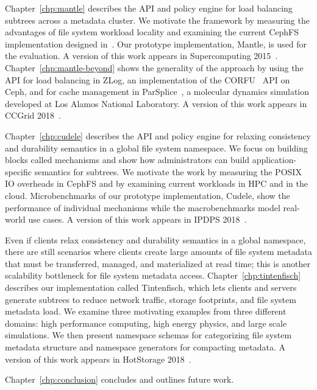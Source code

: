 Chapter~\ref{chp:mantle} describes the API and policy engine for load balancing
subtrees across a metadata cluster. We motivate the framework by measuring the
advantages of file system workload locality and examining the current CephFS
implementation designed in~\cite{weil:osdi2006-ceph, weil:sc2004-dyn-metadata}.
Our prototype implementation, Mantle, is used for the evaluation. A version of
this work appears in Supercomputing 2015~\cite{sevilla:sc15-mantle}.
Chapter~\ref{chp:mantle-beyond} shows the generality of the approach by using
the API for load balancing in ZLog, an implementation of the
CORFU~\cite{balakrishnan_corfu_2012} API on Ceph, and for cache management in
ParSplice~\cite{perez:jctc20150parsplice}, a molecular dynamics simulation
developed at Los Alamos National Laboratory. A version of this work appears in
CCGrid 2018~\cite{sevilla:ccgrid18-parsplice}.

Chapter~\ref{chp:cudele} describes the API and policy engine for relaxing
consistency and durability semantics in a global file system namespace. We
focus on building blocks called mechanisms and show how administrators can
build application-specific semantics for subtrees.  We motivate the work by
measuring the POSIX IO overheads in CephFS and by examining current workloads
in HPC and in the cloud. Microbenchmarks of our prototype implementation,
Cudele, show the performance of individual mechanisms while the macrobenchmarks
model real-world use cases. A version of this work appears in IPDPS
2018~\cite{sevilla:ipdps18-cudele}.

Even if clients relax consistency and durability semantics in a global
namespace, there are still scenarios where clients create large amounts of file
system metadata that must be transferred, managed, and materialized at read
time; this is another scalability bottleneck for file system metadata access.
Chapter~\ref{chp:tintenfisch} describes our implementation called Tintenfisch,
which lets clients and servers generate subtrees to reduce network traffic,
storage footprints, and file system metadata load. We examine three motivating
examples from three different domains: high performance computing, high energy
physics, and large scale simulations. We then present namespace schemas for
categorizing file system metadata structure and namespace generators for
compacting metadata. A version of this work appears in HotStorage
2018~\cite{sevilla:hotstorage18-tintenfisch}.

Chapter~\ref{chp:conclusion} concludes and outlines future work.

